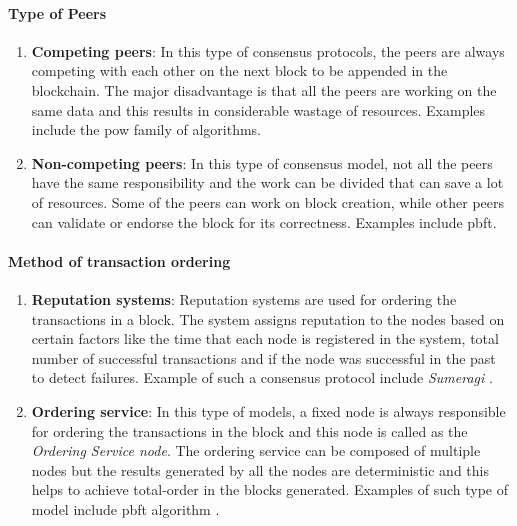\documentclass[
  a4paper,  %
  twoside,  %
  bibliography=totoc,
  headsepline,
  cleardoublepage=empty,
  parskip=half,
  draft=false
]{scrbook}
\begin{document}
\paragraph{Type of Peers}
\begin{enumerate}
    \item \textbf{Competing peers}: In this type of consensus protocols, the peers are always competing with each other on the next block to be appended in the blockchain. The major disadvantage is that all the peers are working on the same data and this results in considerable wastage of resources. Examples include the \gls{pow} family of algorithms.
    \item \textbf{Non-competing peers}: In this type of consensus model, not all the peers have the same responsibility and the work can be divided that can save a lot of resources. Some of the peers can work on block creation, while other peers can validate or endorse the block for its correctness. Examples include \gls{pbft}.
\end{enumerate}

\paragraph{Method of transaction ordering}
\begin{enumerate}
    \item \textbf{Reputation systems}: Reputation systems are used for ordering the transactions in a block. The system assigns reputation to the nodes based on certain factors like the time that each node is registered in the system, total number of successful transactions and if the node was successful in the past to detect failures. Example of such a consensus protocol include \textit{Sumeragi} \cite{HW1}.
    \item \textbf{Ordering service}: In this type of models, a fixed node is always responsible for ordering the transactions in the block and this node is called as the \textit{Ordering Service node}. The ordering service can be composed of multiple nodes but the results generated by all the nodes are deterministic and this helps to achieve total-order in the blocks generated. Examples of such type of model include \gls{pbft} algorithm \cite{HF}.
\end{enumerate}
\end{document}
